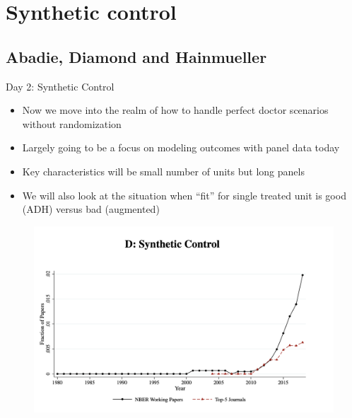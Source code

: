 \documentclass{beamer}
\begin{document}




\section{Synthetic control}

\subsection{Abadie, Diamond and Hainmueller}

\begin{frame}{Day 2: Synthetic Control}

\begin{itemize}
\item Now we move into the realm of how to handle perfect doctor scenarios without randomization
\item Largely going to be a focus on modeling outcomes with panel data today
\item Key characteristics will be small number of units but long panels
\item We will also look at the situation when ``fit'' for single treated unit is good (ADH) versus bad (augmented)
\end{itemize}

\end{frame}

\begin{frame}[plain]
	\begin{figure}
	\includegraphics[scale=0.25]{./lecture_includes/currie_synth.png}
	\end{figure}
\end{frame}
\end{document}

